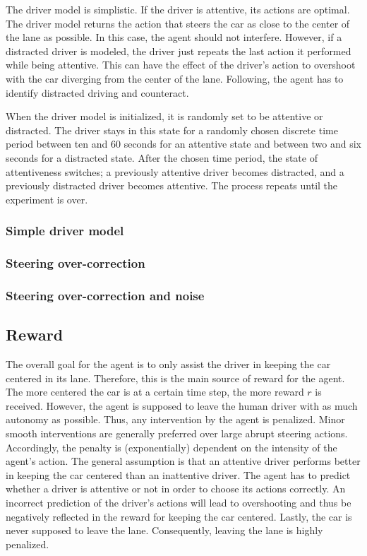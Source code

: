 
The driver model is simplistic. If the driver is attentive, its actions are optimal. The driver model returns the action that steers the car as close to the center of the lane as possible. In this case, the agent should not interfere. However, if a distracted driver is modeled, the driver just repeats the last action it performed while being attentive. This can have the effect of the driver's action to overshoot with the car diverging from the center of the lane. Following, the agent has to identify distracted driving and counteract.

When the driver model is initialized, it is randomly set to be attentive or distracted. The driver stays in this state for a randomly chosen discrete time period between ten and 60 seconds for an attentive state and between two and six seconds for a distracted state. After the chosen time period, the state of attentiveness switches; a previously attentive driver becomes distracted, and a previously distracted driver becomes attentive. The process repeats until the experiment is over.

\subsubsection{Simple driver model}


\subsubsection{Steering over-correction}


\subsubsection{Steering over-correction and noise}

\subsection{Reward}
\label{sec:reward}

The overall goal for the agent is to only assist the driver in keeping the car centered in its lane. Therefore, this is the main source of reward for the agent. The more centered the car is at a certain time step, the more reward $r$ is received. However, the agent is supposed to leave the human driver with as much autonomy as possible. Thus, any intervention by the agent is penalized. Minor smooth interventions are generally preferred over large abrupt steering actions. Accordingly, the penalty is (exponentially) dependent on the intensity of the agent's action. The general assumption is that an attentive driver performs better in keeping the car centered than an inattentive driver. The agent has to predict whether a driver is attentive or not in order to choose its actions correctly. An incorrect prediction of the driver's actions will lead to overshooting and thus be negatively reflected in the reward for keeping the car centered. Lastly, the car is never supposed to leave the lane. Consequently, leaving the lane is highly penalized.


